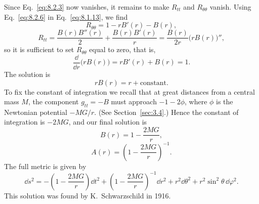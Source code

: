 Since Eq.~\eqref{eq:8.2.3} now vanishes, it remains to make
\(R_{tt}\) and \(R_{\theta\theta}\) vanish. Using Eq.~\eqref{eq:8.2.6}
in Eq.~\eqref{eq:8.1.13}, we find
\begin{equation}
  R_{\theta\theta}=1-rB'(r)-B(r),
  \tag{8.2.7}\label{eq:8.2.7}
\end{equation}
\begin{equation}
  R_{tt}
  =
  \frac{B(r)B''(r)}{2}
  +\frac{B(r)B'(r)}{r}
  =
  \frac{B(r)}{2r}\bigl(rB(r)\bigr)'',
  \tag{8.2.8}\label{eq:8.2.8}
\end{equation}
so it is sufficient to set \(R_{\theta\theta}\) equal to zero, that is,
\[
  \frac{\dd}{\dd r}\bigl(rB(r)\bigr)=rB'(r)+B(r)=1.
\]
The solution is
\begin{equation}
  rB(r)=r+\text{constant}.
  \tag{8.2.9}\label{eq:8.2.9}
\end{equation}
To fix the constant of integration we recall that at great distances from a
central mass \(M\), the component \(g_{tt}=-B\) must approach
\(-1-2\phi\), where \(\phi\) is the Newtonian potential \(-MG/r\).
(See Section~\ref{sec:3.4}.) Hence the constant of integration is
\(-2MG\), and our final solution is
\begin{equation}
  B(r)=1-\frac{2MG}{r},
  \tag{8.2.10}\label{eq:8.2.10}
\end{equation}
\begin{equation}
  A(r)=\left(1-\frac{2MG}{r}\right)^{-1}.
  \tag{8.2.11}\label{eq:8.2.11}
\end{equation}
The full metric is given by
\begin{equation}
  \dd s^2
  =
  -\left(1-\frac{2MG}{r}\right)\dd t^2
  +\left(1-\frac{2MG}{r}\right)^{-1}\dd r^2
  +r^2\dd\theta^2+r^2\sin^2\theta\,\dd\varphi^2.
  \tag{8.2.12}\label{eq:8.2.12}
\end{equation}
This solution was found by K.~Schwarzschild in 1916.

